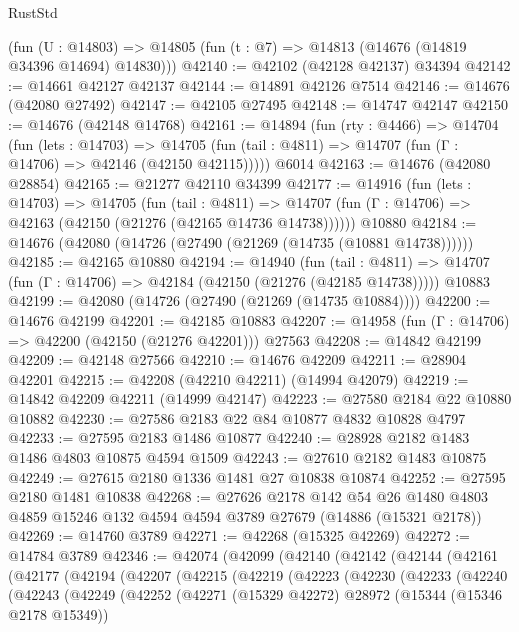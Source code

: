 \begin{lexlean}{RustStd}
\begin{coremodule}
    (fun (U : @14803) => @14805 (fun (t : @7) => @14813 (@14676 (@14819 @34396 @14694) @14830)))
@42140 := @42102 (@42128 @42137) @34394
@42142 := @14661 @42127 @42137
@42144 := @14891 @42126 @7514
@42146 := @14676 (@42080 @27492)
@42147 := @42105 @27495
@42148 := @14747 @42147
@42150 := @14676 (@42148 @14768)
@42161 := @14894
    (fun (rty : @4466) =>
    @14704
      (fun (lets : @14703) =>
      @14705 (fun (tail : @4811) => @14707 (fun (Γ : @14706) => @42146 (@42150 @42115)))))
    @6014
@42163 := @14676 (@42080 @28854)
@42165 := @21277 @42110 @34399
@42177 := @14916
    (fun (lets : @14703) =>
    @14705
      (fun (tail : @4811) =>
      @14707 (fun (Γ : @14706) => @42163 (@42150 (@21276 (@42165 @14736 @14738))))))
    @10880
@42184 := @14676 (@42080 (@14726 (@27490 (@21269 (@14735 (@10881 @14738))))))
@42185 := @42165 @10880
@42194 := @14940
    (fun (tail : @4811) => @14707 (fun (Γ : @14706) => @42184 (@42150 (@21276 (@42185 @14738)))))
    @10883
@42199 := @42080 (@14726 (@27490 (@21269 (@14735 @10884))))
@42200 := @14676 @42199
@42201 := @42185 @10883
@42207 := @14958 (fun (Γ : @14706) => @42200 (@42150 (@21276 @42201))) @27563
@42208 := @14842 @42199
@42209 := @42148 @27566
@42210 := @14676 @42209
@42211 := @28904 @42201
@42215 := @42208 (@42210 @42211) (@14994 @42079)
@42219 := @14842 @42209 @42211 (@14999 @42147)
@42223 := @27580 @2184 @22 @10880 @10882
@42230 := @27586 @2183 @22 @84 @10877 @4832 @10828 @4797
@42233 := @27595 @2183 @1486 @10877
@42240 := @28928 @2182 @1483 @1486 @4803 @10875 @4594 @1509
@42243 := @27610 @2182 @1483 @10875
@42249 := @27615 @2180 @1336 @1481 @27 @10838 @10874
@42252 := @27595 @2180 @1481 @10838
@42268 := @27626
    @2178
    @142
    @54
    @26
    @1480
    @4803
    @4859
    @15246
    @132
    @4594
    @4594
    @3789
    @27679
    (@14886 (@15321 @2178))
@42269 := @14760 @3789
@42271 := @42268 (@15325 @42269)
@42272 := @14784 @3789
@42346 := @42074
    (@42099
      (@42140
        (@42142
          (@42144
            (@42161
              (@42177
                (@42194
                  (@42207
                    (@42215
                      (@42219
                        (@42223
                          (@42230
                            (@42233
                              (@42240
                                (@42243
                                  (@42249
                                    (@42252
                                      (@42271
                                        (@15329 @42272)
                                        @28972
                                        (@15344 (@15346 @2178 @15349))

\end{coremodule}
\end{lexlean}
